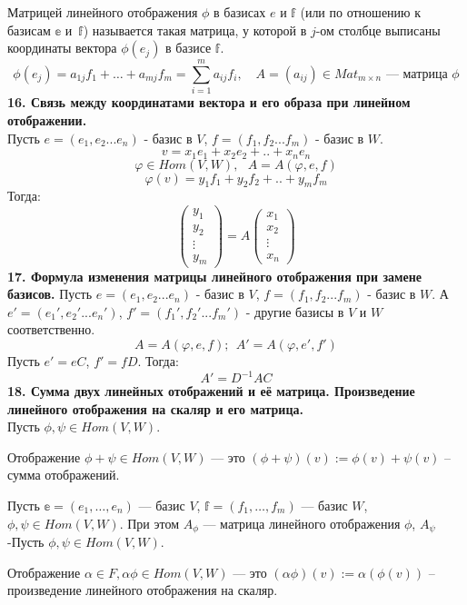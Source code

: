 \documentclass{article}
\begin{document}
Матрицей линейного отображения $\phi$ в базисах $e$ и $\mathbb{f}$ (или по отношению к базисам $\mathbb{e}$ и~$\mathbb{f}$) называется такая матрица, у которой в $j$-ом столбце выписаны координаты вектора $\phi(e_j)$ в базисе $\mathbb{f}$.
\[
\phi(e_j) = a_{1j}f_1 + \ldots + a_{mj}f_m = \sum_{i = 1}^{m}a_{ij}f_i, \quad A = (a_{ij}) \in Mat_{m\times n} \text{ --- матрица $\phi$}
\]
\newline
\newline
\textbf{16. Связь между координатами вектора и его образа при линейном отображении.}\\
Пусть $e = (e_1, e_2...e_n)$ - базис в $V$, $f = (f_1, f_2...f_m)$ - базис в $W$. 
$$v = x_1e_1+x_2e_2+..+x_ne_n$$
$$\varphi \in Hom(V,W),~~~A=A(\varphi, e, f)$$
$$\varphi(v)=y_1f_1+y_2f_2+..+y_mf_m$$
Тогда:
$$\begin{pmatrix} y_1\\y_2\\\vdots\\y_m\end{pmatrix}=A\begin{pmatrix}x_1\\x_2\\\vdots\\x_n\end{pmatrix}
$$
\newline
\newline
\textbf{17. Формула изменения матрицы линейного отображения при замене базисов.}
Пусть $e = (e_1, e_2...e_n)$ - базис в $V$, $f = (f_1, f_2...f_m)$ - базис в $W$. А $e' = (e_1', e_2'...e_n')$, $f' = (f_1', f_2'...f_m')$ - другие базисы в $V$ и $W$ соответственно.
$$A=A(\varphi,e,f);~~A'=A(\varphi, e', f')$$
Пусть $e'=eC$, $f'=fD$. Тогда:
$$A'=D^{-1}AC$$
\newline
\newline
\textbf{18. Сумма двух линейных отображений и её матрица. Произведение линейного отображения на скаляр и его
матрица.}\\
Пусть $\phi, \psi \in Hom(V, W)$.

Отображение $\phi + \psi \in Hom(V, W)$ --- это $(\phi + \psi)(v):= \phi(v) + \psi(v)$ -- сумма отображений.

Пусть $\mathbb{e} = (e_1, \ldots, e_n)$ --- базис $V$, $\mathbb{f} = (f_1, \ldots, f_m)$ --- базис $W$, $\phi, \psi \in Hom(V, W)$. При этом $A_{\phi}$ --- матрица линейного отображения $\phi$, $A_{\psi}$ -Пусть $\phi, \psi \in Hom(V, W)$.

Отображение $\alpha \in F, \alpha\phi \in Hom(V, W)$ --- это $(\alpha\phi)(v) := \alpha(\phi(v))$ -- произведение линейного отображения на скаляр.
\end{document}
